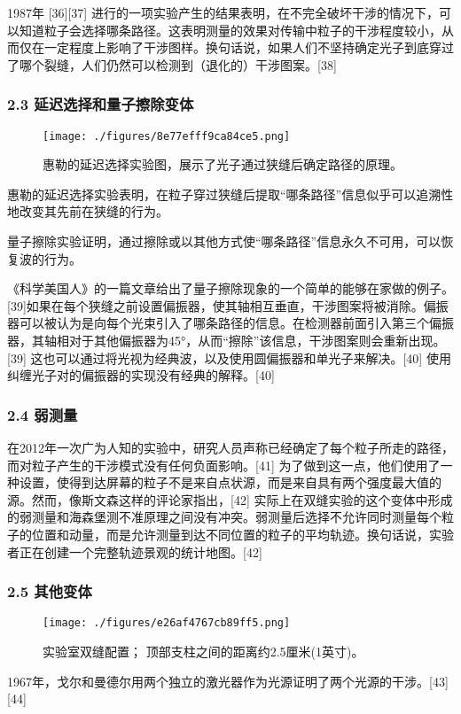 1987年 [36][37] 进行的一项实验产生的结果表明，在不完全破坏干涉的情况下，可以知道粒子会选择哪条路径。这表明测量的效果对传输中粒子的干涉程度较小，从而仅在一定程度上影响了干涉图样。换句话说，如果人们不坚持确定光子到底穿过了哪个裂缝，人们仍然可以检测到（退化的）干涉图案。[38]

\subsubsection{2.3 延迟选择和量子擦除变体}
\begin{figure}[ht]
\centering
\texttt{[image: ./figures/8e77efff9ca84ce5.png]}
\caption{惠勒的延迟选择实验图，展示了光子通过狭缝后确定路径的原理。} \label{fig_SFSY_4}
\end{figure}
惠勒的延迟选择实验表明，在粒子穿过狭缝后提取“哪条路径”信息似乎可以追溯性地改变其先前在狭缝的行为。

量子擦除实验证明，通过擦除或以其他方式使“哪条路径”信息永久不可用，可以恢复波的行为。

《科学美国人》的一篇文章给出了量子擦除现象的一个简单的能够在家做的例子。[39]如果在每个狭缝之前设置偏振器，使其轴相互垂直，干涉图案将被消除。偏振器可以被认为是向每个光束引入了哪条路径的信息。在检测器前面引入第三个偏振器，其轴相对于其他偏振器为45°，从而“擦除”该信息，干涉图案则会重新出现。[39] 这也可以通过将光视为经典波，以及使用圆偏振器和单光子来解决。[40] 使用纠缠光子对的偏振器的实现没有经典的解释。[40]

\subsubsection{2.4 弱测量}
在2012年一次广为人知的实验中，研究人员声称已经确定了每个粒子所走的路径，而对粒子产生的干涉模式没有任何负面影响。[41] 为了做到这一点，他们使用了一种设置，使得到达屏幕的粒子不是来自点状源，而是来自具有两个强度最大值的源。然而，像斯文森这样的评论家指出，[42] 实际上在双缝实验的这个变体中形成的弱测量和海森堡测不准原理之间没有冲突。弱测量后选择不允许同时测量每个粒子的位置和动量，而是允许测量到达不同位置的粒子的平均轨迹。换句话说，实验者正在创建一个完整轨迹景观的统计地图。[42]

\subsubsection{2.5 其他变体}
\begin{figure}[ht]
\centering
\texttt{[image: ./figures/e26af4767cb89ff5.png]}
\caption{实验室双缝配置； 顶部支柱之间的距离约2.5厘米(1英寸)。} \label{fig_SFSY_5}
\end{figure}
1967年，戈尔和曼德尔用两个独立的激光器作为光源证明了两个光源的干涉。[43][44]


